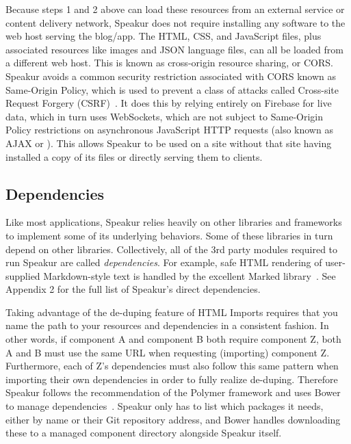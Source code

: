 Because steps 1 and 2 above can load these resources from an external service or content delivery network,
Speakur does not require installing any software to the web host serving the blog/app.
The HTML, CSS, and JavaScript files, plus associated resources like images and JSON language files, 
can all be loaded from a different web host. 
This is known as cross-origin resource sharing, or CORS.
Speakur avoids a common security restriction associated with CORS known as Same-Origin Policy, which is used to prevent a class of attacks called Cross-site Request Forgery (CSRF)~\cite{mozillacontributors2015-b}.
It does this by relying entirely on Firebase for live data,
which in turn uses WebSockets,
which are not subject to Same-Origin Policy restrictions on asynchronous JavaScript HTTP requests (also known as AJAX or ).
This allows Speakur to be used on a site without that site having installed a copy of its files or directly serving them to clients.

\subsection{Dependencies}
\label{sec:dependencies}
Like most applications, Speakur relies heavily on other libraries and frameworks to implement some of its underlying behaviors. 
Some of these libraries in turn depend on other libraries.
Collectively, all of the 3rd party modules required to run Speakur are called \textit{dependencies}.
For example, safe HTML rendering of user-supplied Markdown-style text is handled by the excellent Marked library~\cite{christopherjeffrey2014}.
See Appendix 2 for the full list of Speakur's direct dependencies.

Taking advantage of the de-duping feature of HTML Imports
requires that you name the path to your resources and dependencies in a consistent fashion.
In other words, if component A and component B both require component Z, both A and B must use the same URL when requesting (importing) component Z.
Furthermore, each of Z's dependencies must also follow this same pattern when importing their own dependencies in order to fully realize de-duping.
Therefore Speakur follows the recommendation of the Polymer framework and uses Bower to manage dependencies~\cite{bowercontributors2015}. 
Speakur only has to list which packages it needs, either by name or their Git repository address, 
and Bower handles downloading these to a managed component directory alongside Speakur itself.

